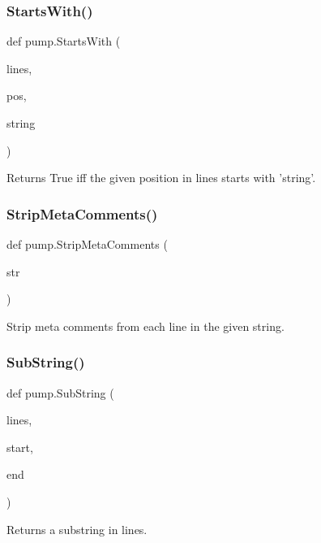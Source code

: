 \subsubsection{\texorpdfstring{StartsWith()}{StartsWith()}}
{\footnotesize\ttfamily def pump.\+Starts\+With (\begin{DoxyParamCaption}\item[{}]{lines,  }\item[{}]{pos,  }\item[{}]{string }\end{DoxyParamCaption})}

\begin{DoxyVerb}Returns True iff the given position in lines starts with 'string'.\end{DoxyVerb}
 \mbox{\label{namespacepump_a8c50cb40d65f26771c6f51eb265bb569}} 
\subsubsection{\texorpdfstring{StripMetaComments()}{StripMetaComments()}}
{\footnotesize\ttfamily def pump.\+Strip\+Meta\+Comments (\begin{DoxyParamCaption}\item[{}]{str }\end{DoxyParamCaption})}

\begin{DoxyVerb}Strip meta comments from each line in the given string.\end{DoxyVerb}
 \mbox{\label{namespacepump_a859edb180cfc24c24fabcfb4f2bedf9e}} 
\subsubsection{\texorpdfstring{SubString()}{SubString()}}
{\footnotesize\ttfamily def pump.\+Sub\+String (\begin{DoxyParamCaption}\item[{}]{lines,  }\item[{}]{start,  }\item[{}]{end }\end{DoxyParamCaption})}

\begin{DoxyVerb}Returns a substring in lines.\end{DoxyVerb}
 \mbox{\label{namespacepump_aa42c23b1c914c0f86a94f2fa32999905}} 

